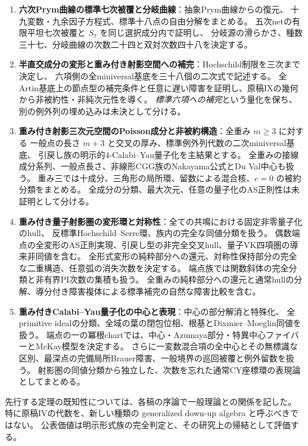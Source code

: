 \begin{enumerate}[label=\textbf{\Roman*.}]
逆Gramの四十五次元支配性から第二の楕円moduliを得る。
三次pencilでKummer写像を明示し、第三の二次被覆のAlbaneseと二次同種写像を決定する。
\item \textbf{六次Prym曲線の標準七次被覆と分岐曲線}：抽象Prym曲線からの復元、
十九変数・九余因子方程式、標準十八点の自由分解をまとめる。
五次netの有限平坦七次被覆と $S_7$ を同じ選択成分内で証明し、
分岐源の滑らかさ、種数三十七、分岐曲線の次数二十四と双対次数四十八を決定する。
\item \textbf{半直交成分の変形と重み付き射影空間への補完}：Hochschild制限を三次まで決定し、
六項側の全miniversal基底を三十八個の二次式で記述する。
全Artin基底上の節点型の補完条件と任意に遅い障害を証明し、原稿IXの幾何から非被約性・非純次元性を導く。
\emph{標準六項への補完}という量化を保ち、別の例外列の埋め込みは未決として分ける。
\item \textbf{重み付き射影三次元空間のPoisson成分と非被約構造}：全重み $m\ge3$ に対する
一般点の長さ $m+3$ と交叉の厚み、標準例外列代数の二次miniversal基底、
引戻し族の明示的4-Calabi--Yau量子化を主結果とする。
全重みの接線成分系列、一般点長さ、非線形CGG族のNakayama公式とDu Val中心も扱う。
重み三では十成分、三角形の局所環、留数による混合核、$c=0$ の被約分類をまとめる。
全成分の分類、最大次元、任意の量子化のAS正則性は未証明として分ける。
\item \textbf{重み付き量子射影圏の変形環と対称性}：全ての共鳴における固定非零量子化のhull、
反標準Hochschild--Serre環、族内の完全な同値分類を扱う。
偶数端点の全変形のAS正則実現、引戻し型の非完全交叉hull、量子VK四項圏の導来非同値を含む。
全形式変形の純粋部分への還元、対称性保持部分の完全な二重構造、任意弧の消失次数を決定する。
端点族では関数斜体の完全分類と非有界PI次数の集積も扱う。
全重みの純粋部分への還元と通常hullの分解、導分付き障害複体による標準補完の自然な障害比較を含む。
\item \textbf{重み付きCalabi--Yau量子化の中心と表現}：中心の部分解消と特殊化、
全primitive idealの分類、全域の葉の閉包位相、根基とDixmier--Moeglin同値を扱う。
端点の一の冪根chartでは、中心・Azumaya部分・特異中心ファイバーとMcKay模型を決定する。
さらに一変数混合項の全中心とその無標識な区別、最深点の完備局所Brauer障害、一般境界の巡回被覆と例外留数を扱う。
射影圏の同値分類から独立した、次数を忘れた通常CY座標環の表現論としてまとめる。
\end{enumerate}

先行する定理の既知性については、各稿の序論で一般理論との関係を記した。
特に原稿IVの代数を、新しい種類の generalized down-up algebra と呼ぶべきではない。
公表価値は明示形式族の完全判定と、その研究上の帰結として評価する。

